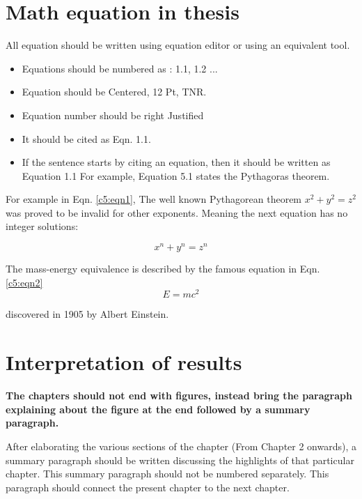 \section{Math equation in thesis}
All equation should be written using equation editor or using an equivalent tool.
\begin{itemize}
	\item Equations should be numbered as : 1.1, 1.2 ...
	\item Equation should be Centered, 12 Pt, TNR. 
	\item Equation number should be right Justified
	\item It should be cited as Eqn. 1.1.
   \item If the sentence starts by citing an equation, then it should be written as Equation 1.1 For example, Equation 5.1 states the Pythagoras theorem.

	
\end{itemize}

For example in Eqn. \ref{c5:eqn1}, The well known Pythagorean theorem $x^2 + y^2 = z^2$ was 
proved to be invalid for other exponents. 
Meaning the next equation has no integer solutions:

\begin{equation}
\label{c5:eqn1}
	x^n + y^n = z^n
\end{equation}

The mass-energy equivalence is described by the famous equation in Eqn. \ref{c5:eqn2}
\begin{equation}
\label{c5:eqn2}
	E=mc^2
\end{equation}

discovered in 1905 by Albert Einstein. 

\section{Interpretation of results}

\vspace{2.5cm}

 \textbf{The chapters should not end with figures, instead bring the paragraph explaining about the figure at the end followed by a summary paragraph.}

After elaborating the various sections of the chapter (From Chapter 2 onwards), a summary paragraph should be written discussing the highlights of that particular chapter. This summary paragraph should not be numbered separately. This paragraph should connect the present chapter to the next chapter.



